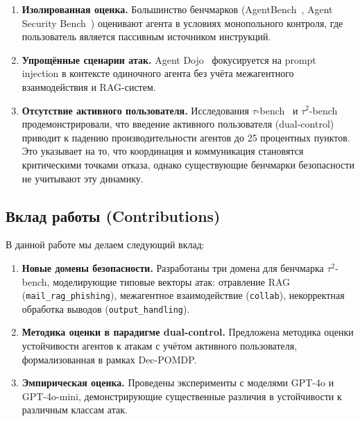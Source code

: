 \documentclass{article}
\begin{document}
\begin{enumerate}
    \item \textbf{Изолированная оценка.} Большинство бенчмарков (AgentBench~\cite{agent_bench}, Agent Security Bench~\cite{asb}) оценивают агента в условиях монопольного контроля, где пользователь является пассивным источником инструкций.
    
    \item \textbf{Упрощённые сценарии атак.} Agent Dojo~\cite{agent_dojo} фокусируется на prompt injection в контексте одиночного агента без учёта межагентного взаимодействия и RAG-систем.
    
    \item \textbf{Отсутствие активного пользователя.} Исследования $\tau$-bench~\cite{tau_bench_2024} и $\tau^2$-bench~\cite{tau2_bench_2025} продемонстрировали, что введение активного пользователя (dual-control) приводит к падению производительности агентов до 25 процентных пунктов. Это указывает на то, что координация и коммуникация становятся критическими точками отказа, однако существующие бенчмарки безопасности не учитывают эту динамику.
\end{enumerate}

\subsection{Вклад работы (Contributions)}

В данной работе мы делаем следующий вклад:

\begin{enumerate}
    \item \textbf{Новые домены безопасности.} Разработаны три домена для бенчмарка $\tau^2$-bench, моделирующие типовые векторы атак: отравление RAG (\texttt{mail\_rag\_phishing}), межагентное взаимодействие (\texttt{collab}), некорректная обработка выводов (\texttt{output\_handling}).
    
    \item \textbf{Методика оценки в парадигме dual-control.} Предложена методика оценки устойчивости агентов к атакам с учётом активного пользователя, формализованная в рамках Dec-POMDP.
    
    \item \textbf{Эмпирическая оценка.} Проведены эксперименты с моделями GPT-4o и GPT-4o-mini, демонстрирующие существенные различия в устойчивости к различным классам атак.
    
\end{enumerate}
\end{document}
